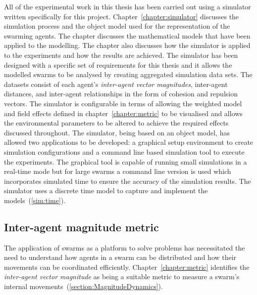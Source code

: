 All of the experimental work in this thesis has been carried out using a simulator written specifically for this project. Chapter~\ref{chapter:simulator} discusses the simulation process and the object model used for the representation of the swarming agents. The chapter discusses the mathematical models that have been applied to the modelling. The chapter also discusses how the simulator is applied to the experiments and how the results are achieved. The simulator has been designed with a specific set of requirements for this thesis and it allows the modelled swarms to be analysed by creating aggregated simulation data sets. The datasets consist of each agent's \textit{inter-agent vector magnitudes}, inter-agent distances, and inter-agent relationships in the form of cohesion and repulsion vectors. The simulator is configurable in terms of allowing the weighted model and field effects defined in chapter~\ref{chapter:metric} to be visualised and allows the environmental parameters to be altered to achieve the required effects discussed throughout. The simulator, being based on an object model, has allowed two applications to be developed: a graphical setup environment to create simulation configurations and a command line based simulation tool to execute the experiments. The graphical tool is capable of running small simulations in a real-time mode but for large swarms a command line version is used which incorporates simulated time to ensure the accuracy of the simulation results. The simulator uses a discrete time model to capture and implement the models~(\autoref{sim:time}). 

\subsection{Inter-agent magnitude metric}
The application of swarms as a platform to solve problems has necessitated the need to understand how agents in a swarm can be distributed and how their movements can be coordinated efficiently. Chapter~\ref{chapter:metric} identifies the \textit{inter-agent vector magnitude} as being a suitable metric to measure a swarm's internal movements~(\autoref{section:MagnitudeDynamics}). 


